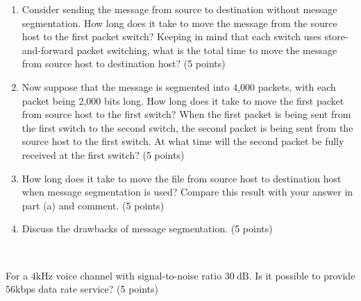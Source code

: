 \begin{exercise}[]
{    \begin{enumerate}
        \item Consider sending the message from source to destination without message segmentation. How long does it take to move the message from the source host to the first packet switch? Keeping in mind that each switch uses store-and-forward packet switching, what is the total time to move the message from source host to destination host? (5 points)
        \item  Now suppose that the message is segmented into 4,000 packets, with each packet being 2,000 bits long. How long does it take to move the first packet from source host to the first switch? When the first packet is being sent from the first switch to the second switch, the second packet is being sent from the source host to the first switch. At what time will the second packet be fully received at the first switch? (5 points)
        \item How long does it take to move the file from source host to destination host when message segmentation is used? Compare this result with your answer in part (a) and comment. (5 points)
        \item Discuss the drawbacks of message segmentation. (5 points)
    \end{enumerate}
    }
  \begin{solution}
  \par{~}
  \end{solution}
  \label{ex4}
\end{exercise}


\begin{exercise}[]{For a $4 \mathrm{kHz}$ voice channel with signal-to-noise ratio $30 \mathrm{~dB} .$ Is it possible to provide 56kbps data rate service? (5 points)}
  \begin{solution}
  \par{~}
  \end{solution}
  \label{ex5}
\end{exercise}


